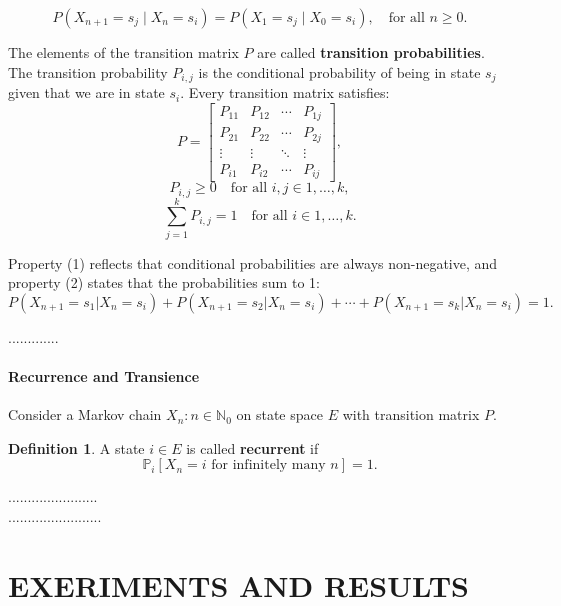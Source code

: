 \documentclass[12pt,a4paper,oneside]{book}
\theoremstyle{definition}
\newtheorem{definition}{Definition}[section]
\begin{document}
\begin{equation}
P(X_{n+1} = s_j \mid X_n = s_i) = P(X_1 = s_j \mid X_0 = s_i), \quad \text{for all } n \geq 0.
\end{equation}

The elements of the transition matrix $P$ are called \textbf{transition probabilities}. The transition probability $P_{i,j}$ is the conditional probability of being in state $s_j$ given that we are in state $s_i$.
Every transition matrix satisfies:
\[
    P =
    \begin{bmatrix}
        P_{11} & P_{12} & \cdots & P_{1j} \\
        P_{21} & P_{22} & \cdots & P_{2j} \\
        \vdots & \vdots & \ddots & \vdots \\
        P_{i1} & P_{i2} & \cdots & P_{ij}
    \end{bmatrix}, 
\]
\[
    P_{i,j} \geq 0 \quad \text{for all } i, j \in {1, \ldots, k}, \tag{1} 
\]
\[
    \sum_{j=1}^k P_{i,j} = 1 \quad \text{for all } i \in {1, \ldots, k}. \tag{2}
\]

Property (1) reflects that conditional probabilities are always non-negative, and property (2) states that the probabilities sum to 1:
\begin{equation}
    P(X_{n+1} = s_1 | X_n = s_i) + P(X_{n+1} = s_2 | X_n = s_i) + \cdots + P(X_{n+1} = s_k | X_n = s_i) = 1.
\end{equation}

.............

\subsubsection{Recurrence and Transience}

Consider a Markov chain ${X_n : n \in \mathbb{N}_0}$ on state space $E$ with transition matrix $P$.

\begin{definition}\label{def:recurrent}
A state $i \in E$ is called \textbf{recurrent} if
\begin{equation}
\mathbb{P}_i[X_n = i \text{ for infinitely many } n] = 1.
\end{equation}
\end{definition}

.......................\\
........................\\


\chapter{EXERIMENTS AND RESULTS}
\label{ch4}
\end{document}
